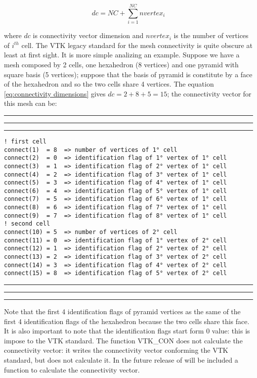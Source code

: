 \documentclass[pagesize=pdftex,fontsize=10pt,paper=a4,oneside]{scrbook}
\DeclareRobustCommand{\MarginNote}[1]{\marginpar{%
\slshape\footnotesize%
\parindent=0pt\lineskip=0pt\lineskiplimit=0pt%
\tolerance=2000\hyphenpenalty=300\exhyphenpenalty=300%
\doublehyphendemerits=100000\finalhyphendemerits=\doublehyphendemerits%
\raggedright\hspace{0pt}#1}}
\newenvironment{boxred}[1]%
               {%
                \noindent\hspace*{-0.025\textwidth}%
                \color{Maroon}%
                \rule[-5.8pt]{0.6pt}{6pt}\hspace*{-0.6pt}\rule{1.05\textwidth}{0.6pt}\hspace*{-0.6pt}\rule[-5.8pt]{0.6pt}{6pt}%
                \color{black}%
                \vspace*{0.6pt}\MarginNote{\color{Maroon}{#1}}%
               }%
               {%
                \noindent\hspace*{-0.025\textwidth}%
                \color{Maroon}%
                \rule[0pt]{0.6pt}{6pt}\hspace*{-0.6pt}\rule{1.05\textwidth}{0.6pt}\hspace*{-0.6pt}\rule[0pt]{0.6pt}{6pt}%
                \color{black}%
                \vspace*{2mm}%
               }
\begin{document}
\begin{equation}
dc = NC + \sum\limits_{i = 1}^{NC} {nvertex_i }
\label{eq:connectivity dimensions}
\end{equation}

\noindent where $dc$ is connectivity vector dimension and $nvertex_i$ is the number of vertices of $i^{th}$ cell. The VTK
legacy standard for the mesh connectivity is quite obscure at least at first sight. It is more simple analizing an example.
Suppose we have a mesh composed by 2 cells, one hexahedron (8 vertices) and one pyramid with square basis (5 vertices); suppose
that the basis of pyramid is constitute by a face of the hexahedron and so the two cells share 4 vertices. The equation
\ref{eq:connectivity dimensions} gives $dc=2+8+5=15$; the connectivity vector for this mesh can be:

\begin{boxred}{Connectivity vector example for VTK legacy standard}
\begin{verbatim}
! first cell
connect(1)  = 8  => number of vertices of 1° cell
connect(2)  = 0  => identification flag of 1° vertex of 1° cell
connect(3)  = 1  => identification flag of 2° vertex of 1° cell
connect(4)  = 2  => identification flag of 3° vertex of 1° cell
connect(5)  = 3  => identification flag of 4° vertex of 1° cell
connect(6)  = 4  => identification flag of 5° vertex of 1° cell
connect(7)  = 5  => identification flag of 6° vertex of 1° cell
connect(8)  = 6  => identification flag of 7° vertex of 1° cell
connect(9)  = 7  => identification flag of 8° vertex of 1° cell
! second cell
connect(10) = 5  => number of vertices of 2° cell
connect(11) = 0  => identification flag of 1° vertex of 2° cell
connect(12) = 1  => identification flag of 2° vertex of 2° cell
connect(13) = 2  => identification flag of 3° vertex of 2° cell
connect(14) = 3  => identification flag of 4° vertex of 2° cell
connect(15) = 8  => identification flag of 5° vertex of 2° cell
\end{verbatim}
\end{boxred}

\noindent Note that the first 4 identification flags of pyramid vertices as the same of the first 4 identification flags of
the hexahedron because the two cells share this face. It is also important to note that the identification flags start
form $0$ value: this is impose to the VTK standard. The function VTK\_CON does not calculate the connectivity vector: it
writes the connectivity vector conforming the VTK standard, but does not calculate it. In the future release of \LIBVTKIO will
be included a function to calculate the connectivity vector.
\end{document}
